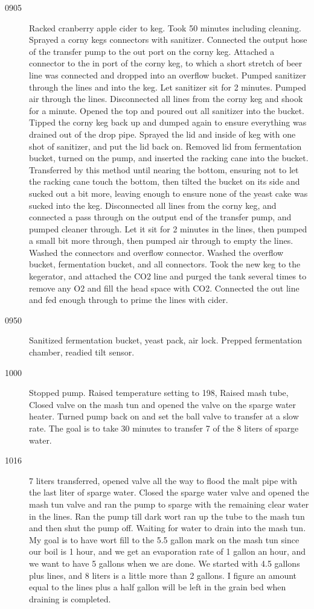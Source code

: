 \begin{description}
    \item[0905] Racked cranberry apple cider to keg.  Took 50 minutes including cleaning.  Sprayed a corny kegs connectors with sanitizer.  Connected the output hose of the transfer pump to the out port on the corny keg.  Attached a connector to the in port of the corny keg, to which a short stretch of beer line was connected and dropped into an overflow bucket.  Pumped sanitizer through the lines and into the keg.  Let sanitizer sit for 2 minutes.  Pumped air through the lines.  Disconnected all lines from the corny keg and shook for a minute.  Opened the top and poured out all sanitizer into the bucket.  Tipped the corny keg back up and dumped again to ensure everything was drained out of the drop pipe.  Sprayed the lid and inside of keg with one shot of sanitizer, and put the lid back on.  Removed lid from fermentation bucket, turned on the pump, and inserted the racking cane into the bucket.  Transferred by this method until nearing the bottom, ensuring not to let the racking cane touch the bottom, then tilted the bucket on its side and sucked out a bit more, leaving enough to ensure none of the yeast cake was sucked into the keg.  Disconnected all lines from the corny keg, and connected a pass through on the output end of the transfer pump, and pumped cleaner through.  Let it sit for 2 minutes in the lines, then pumped a small bit more through, then pumped air through to empty the lines.  Washed the connectors and overflow connector.  Washed the overflow bucket, fermentation bucket, and all connectors.  Took the new keg to the kegerator, and attached the CO2 line and purged the tank several times to remove any O2 and fill the head space with CO2.  Connected the out line and fed enough through to prime the lines with cider.
    \item[0950] Sanitized fermentation bucket, yeast pack, air lock.  Prepped fermentation chamber, readied tilt sensor.
    \item[1000] Stopped pump.  Raised temperature setting to 198, Raised mash tube, Closed valve on the mash tun and opened the valve on the sparge water heater.  Turned pump back on and set the ball valve to transfer at a slow rate.  The goal is to take 30 minutes to transfer 7 of the 8 liters of sparge water.
    \item[1016] 7 liters transferred, opened valve all the way to flood the malt pipe with the last liter of sparge water.  Closed the sparge water valve and opened the mash tun valve and ran the pump to sparge with the remaining clear water in the lines.  Ran the pump till dark wort ran up the tube to the mash tun and then shut the pump off.  Waiting for water to drain into the mash tun.  My goal is to have wort fill to the 5.5 gallon mark on the mash tun since our boil is 1 hour, and we get an evaporation rate of 1 gallon an hour, and we want to have 5 gallons when we are done.  We started with 4.5 gallons plus lines, and 8 liters is a little more than 2 gallons.  I figure an amount equal to the lines plus a half gallon will be left in the grain bed when draining is completed.

\end{description}
